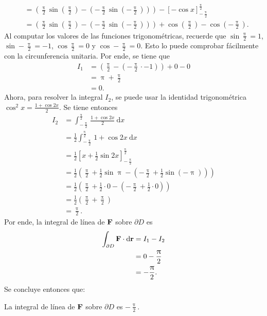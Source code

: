 \documentclass{fmbvecto}
\begin{document}
\begin{problema}
\begin{align*}
        &= \left( \frac{\uppi}{2} \sin \left(\frac{\uppi}{2}\right) - \left( -\frac{\uppi}{2} \sin \left(-\frac{\uppi}{2}\right) \right) \right) - \left[ -\cos x \right]_{-\frac{\uppi}{2}}^{\frac{\uppi}{2}} \\
        &= \left( \frac{\uppi}{2} \sin \left(\frac{\uppi}{2}\right) - \left( -\frac{\uppi}{2} \sin \left(-\frac{\uppi}{2}\right) \right) \right) + \cos \left(\frac{\uppi}{2}\right) - \cos \left(-\frac{\uppi}{2}\right).
    \end{align*}
    Al computar los valores de las funciones trigonométricas, recuerde que \(\sin \frac{\uppi}{2} = 1\), \(\sin -\frac{\uppi}{2} = -1\), \(\cos \frac{\uppi}{2} = 0\) y \(\cos -\frac{\uppi}{2} = 0\). Esto lo puede comprobar fácilmente con la circunferencia unitaria. Por ende, se tiene que
    \begin{align*}
        I_1 &= \left( \frac{\uppi}{2} - \left( -\frac{\uppi}{2} \cdot -1 \right) \right) + 0 - 0 \\
        &= \uppi + \frac{\uppi}{2} \\
        &= 0.
    \end{align*}
    Ahora, para resolver la integral \(I_2\), se puede usar la identidad trigonométrica \(\cos^2 x = \frac{1 + \cos 2x}{2}\). Se tiene entonces
    \begin{align*}
        I_2 &= \int_{-\frac{\uppi}{2}}^{\frac{\uppi}{2}} \frac{1 + \cos 2x}{2} \: \mathrm{d}x \\
        &= \frac{1}{2} \int_{-\frac{\uppi}{2}}^{\frac{\uppi}{2}} 1 + \cos 2x \: \mathrm{d}x \\
        &= \frac{1}{2} \left[ x + \frac{1}{2} \sin 2x \right]_{-\frac{\uppi}{2}}^{\frac{\uppi}{2}} \\
        &= \frac{1}{2} \left( \frac{\uppi}{2} + \frac{1}{2} \sin \uppi - \left( -\frac{\uppi}{2} + \frac{1}{2} \sin \left(-\uppi\right) \right) \right) \\
        &= \frac{1}{2} \left( \frac{\uppi}{2} + \frac{1}{2} \cdot 0 - \left( -\frac{\uppi}{2} + \frac{1}{2} \cdot 0 \right) \right) \\
        &= \frac{1}{2} \left( \frac{\uppi}{2} + \frac{\uppi}{2} \right) \\
        &= \frac{\uppi}{2}.
    \end{align*}
    Por ende, la integral de línea de \(\boldsymbol{{\mathbf{F}}}\) sobre \(\partial D\) es
    \begin{align*}
        \int_{\partial D} \boldsymbol{{\mathbf{F}}} \cdot \mathrm{d}\boldsymbol{{\mathbf{r}}} &= I_1 - I_2 \\
        &= 0 - \frac{\uppi}{2} \\
        &= -\frac{\uppi}{2}.
    \end{align*}
    Se concluye entonces que:
    \begin{gbox}
        La integral de línea de \(\boldsymbol{{\mathbf{F}}}\) sobre \(\partial D\) es \(-\frac{\uppi}{2}\).
    \end{gbox}

\end{problema}
\end{document}
